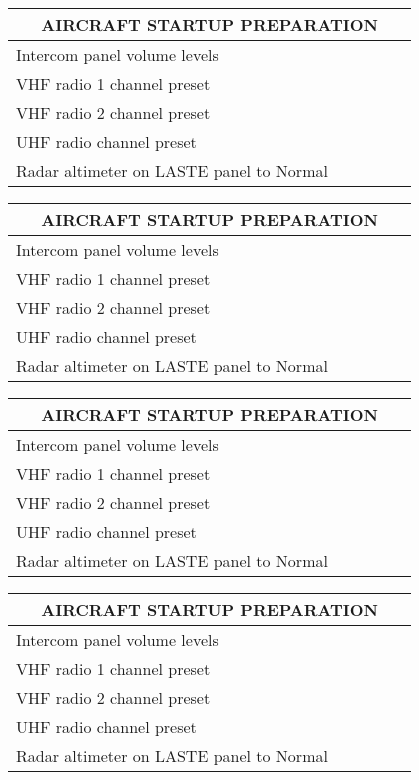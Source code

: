 \documentclass[10pt, twocolumn]{article}
\newenvironment{checklist}[1]{%
  \renewcommand{\item}[2]{%
    ##1\hspace{2em}\dotfill\makebox{\uppercase{##2}}\\
  }
  \newcommand{\step}[1]{%
    \hspace*{10em}-\hspace*{\labelsep}##1\\
  }
  \begin{tabular}{p{0.8\linewidth}}
     \toprule
       \multicolumn{1}{c}{\textbf{\uppercase{#1}}}\\
     \midrule
}{\bottomrule\end{tabular}\vspace{1em}}
\begin{document}
\begin{checklist}{Aircraft Startup Preparation}
  \item{Intercom panel volume levels}{set knobs as needed}
  \item{VHF radio 1 channel preset}{Check preset}
  \item{VHF radio 2 channel preset}{Check preset}
  \item{UHF radio channel preset}{Check preset}
  \item{Radar altimeter on LASTE panel to Normal}{Set to NRM}
\end{checklist}

\begin{checklist}{Aircraft Startup Preparation}
  \item{Intercom panel volume levels}{set knobs as needed}
  \item{VHF radio 1 channel preset}{Check preset}
  \item{VHF radio 2 channel preset}{Check preset}
  \item{UHF radio channel preset}{Check preset}
  \item{Radar altimeter on LASTE panel to Normal}{Set to NRM}
\end{checklist}

\begin{checklist}{Aircraft Startup Preparation}
  \item{Intercom panel volume levels}{set knobs as needed}
  \item{VHF radio 1 channel preset}{Check preset}
  \item{VHF radio 2 channel preset}{Check preset}
  \item{UHF radio channel preset}{Check preset}
  \item{Radar altimeter on LASTE panel to Normal}{Set to NRM}
\end{checklist}

\begin{checklist}{Aircraft Startup Preparation}
  \item{Intercom panel volume levels}{set knobs as needed}
  \item{VHF radio 1 channel preset}{Check preset}
  \item{VHF radio 2 channel preset}{Check preset}
  \item{UHF radio channel preset}{Check preset}
  \item{Radar altimeter on LASTE panel to Normal}{Set to NRM}
\end{checklist}
\end{document}
